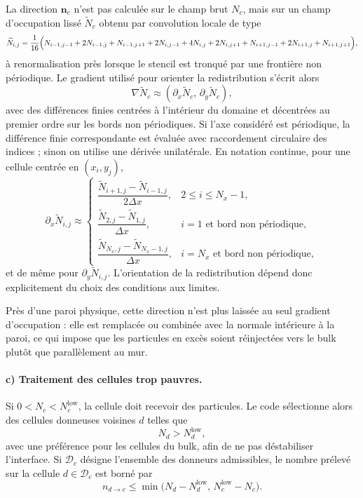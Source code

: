\documentclass[11pt,a4paper]{article}
\begin{document}
La direction $\bm{n}_c$ n'est pas calculée sur le champ brut $N_c$, mais sur un champ d'occupation lissé $\widetilde{N}_c$ obtenu par convolution locale de type
\begin{equation}
  \widetilde{N}_{i,j} = \frac{1}{16}\Bigl(N_{i-1,j-1}+2N_{i-1,j}+N_{i-1,j+1}+2N_{i,j-1}+4N_{i,j}+2N_{i,j+1}+N_{i+1,j-1}+2N_{i+1,j}+N_{i+1,j+1}\Bigr),
\end{equation}
à renormalisation près lorsque le stencil est tronqué par une frontière non périodique. Le gradient utilisé pour orienter la redistribution s'écrit alors
\begin{equation}
  \nabla \widetilde{N}_c \approx \left(\partial_x \widetilde{N}_c,\, \partial_y \widetilde{N}_c\right),
\end{equation}
avec des différences finies centrées à l'intérieur du domaine et décentrées au premier ordre sur les bords non périodiques. Si l'axe considéré est périodique, la différence finie correspondante est évaluée avec raccordement circulaire des indices ; sinon on utilise une dérivée unilatérale. En notation continue, pour une cellule centrée en $(x_i,y_j)$,
\begin{equation}
  \partial_x \widetilde{N}_{i,j} \approx
  \begin{cases}
    \dfrac{\widetilde{N}_{i+1,j}-\widetilde{N}_{i-1,j}}{2\Delta x}, & 2\le i\le N_x-1,\\[1ex]
    \dfrac{\widetilde{N}_{2,j}-\widetilde{N}_{1,j}}{\Delta x}, & i=1 \text{ et bord non périodique},\\[1ex]
    \dfrac{\widetilde{N}_{N_x,j}-\widetilde{N}_{N_x-1,j}}{\Delta x}, & i=N_x \text{ et bord non périodique},
  \end{cases}
\end{equation}
et de même pour $\partial_y \widetilde{N}_{i,j}$. L'orientation de la redistribution dépend donc explicitement du choix des conditions aux limites.

Près d'une paroi physique, cette direction n'est plus laissée au seul gradient d'occupation : elle est remplacée ou combinée avec la normale intérieure à la paroi, ce qui impose que les particules en excès soient réinjectées vers le bulk plutôt que parallèlement au mur.

\paragraph{c) Traitement des cellules trop pauvres.}
Si $0 < N_c < N_c^{\mathrm{low}}$, la cellule doit recevoir des particules. Le code sélectionne alors des cellules donneuses voisines $d$ telles que
\begin{equation}
  N_d > N_d^{\mathrm{low}},
\end{equation}
avec une préférence pour les cellules du bulk, afin de ne pas déstabiliser l'interface. Si $\mathcal{D}_c$ désigne l'ensemble des donneurs admissibles, le nombre prélevé sur la cellule $d\in\mathcal{D}_c$ est borné par
\begin{equation}
  n_{d\to c} \le \min\bigl(N_d - N_d^{\mathrm{low}},\, N_c^{\mathrm{low}}-N_c\bigr).
\end{equation}
\end{document}
